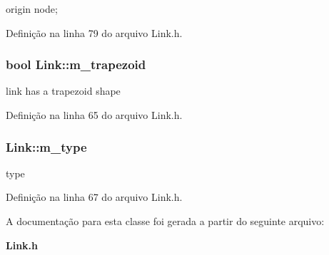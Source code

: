 origin node; 



Definição na linha 79 do arquivo Link.\+h.

\subsubsection[{m\+\_\+trapezoid}]{\setlength{\rightskip}{0pt plus 5cm}bool Link\+::m\+\_\+trapezoid\hspace{0.3cm}{\ttfamily [protected]}}\label{class_link_ac5e7eab8da0db8f5054ca51fbfaa6420}


link has a trapezoid shape 



Definição na linha 65 do arquivo Link.\+h.

\subsubsection[{m\+\_\+type}]{ Link\+::m\+\_\+type\hspace{0.3cm}{\ttfamily [protected]}}\label{class_link_a721817097269ad74f7e1c5c9ce1bd192}


type 



Definição na linha 67 do arquivo Link.\+h.



A documentação para esta classe foi gerada a partir do seguinte arquivo\+:\begin{DoxyCompactItemize}
\item 
{\bf Link.\+h}\end{DoxyCompactItemize}
